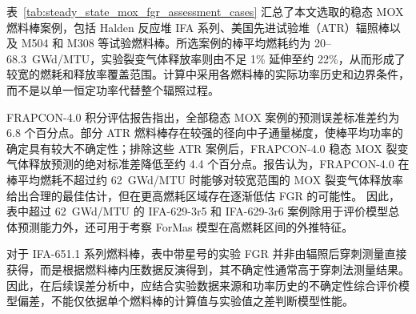 表~\ref{tab:steady_state_mox_fgr_assessment_cases} 汇总了本文选取的稳态 MOX 燃料棒案例，包括 Halden 反应堆 IFA 系列、美国先进试验堆（ATR）辐照棒以及 M504 和 M308 等试验燃料棒。所选案例的棒平均燃耗约为 20--68.3~GWd/MTU，实验裂变气体释放率则由不足 1\% 延伸至约 22\%，从而形成了较宽的燃耗和释放率覆盖范围。计算中采用各燃料棒的实际功率历史和边界条件，而不是以单一恒定功率代替整个辐照过程。

FRAPCON-4.0 积分评估报告指出，全部稳态 MOX 案例的预测误差标准差约为 6.8 个百分点。部分 ATR 燃料棒存在较强的径向中子通量梯度，使棒平均功率的确定具有较大不确定性；排除这些 ATR 案例后，FRAPCON-4.0 稳态 MOX 裂变气体释放预测的绝对标准差降低至约 4.4 个百分点。报告认为，FRAPCON-4.0 在棒平均燃耗不超过约 62~GWd/MTU 时能够对较宽范围的 MOX 裂变气体释放率给出合理的最佳估计，但在更高燃耗区域存在逐渐低估 FGR 的可能性。 因此，表中超过 62~GWd/MTU 的 IFA-629-3r5 和 IFA-629-3r6 案例除用于评价模型总体预测能力外，还可用于考察 ForMas 模型在高燃耗区间的外推特征。

对于 IFA-651.1 系列燃料棒，表中带星号的实验 FGR 并非由辐照后穿刺测量直接获得，而是根据燃料棒内压数据反演得到，其不确定性通常高于穿刺法测量结果。因此，在后续误差分析中，应结合实验数据来源和功率历史的不确定性综合评价模型偏差，不能仅依据单个燃料棒的计算值与实验值之差判断模型性能。

